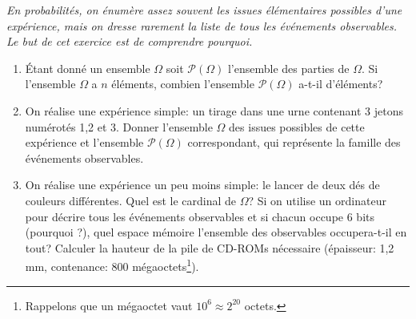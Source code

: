 \documentclass[a4paper,12pt,reqno]{amsart}
\begin{document}
\begin{exo} %

  \emph{En probabilités, on énumère assez souvent les issues élémentaires possibles d'une expérience, mais on dresse rarement la liste de tous les événements observables. Le but de cet exercice est de comprendre pourquoi.}

  \begin{enumerate}

    \item Étant donné un ensemble $\Omega$ soit $\mathcal{P}(\Omega)$ l'ensemble des parties de $\Omega$. Si l'ensemble $\Omega$ a $n$ éléments, combien l'ensemble $\mathcal{P}(\Omega)$ a-t-il d'éléments?

    \item On réalise une expérience simple: un tirage dans une urne contenant 3 jetons numérotés 1,2 et 3.  Donner l'ensemble $\Omega$ des issues possibles de cette expérience et l'ensemble $\mathcal{P}(\Omega)$ correspondant, qui représente la famille des événements observables.

    \item On réalise une expérience un peu moins simple: le lancer de deux dés de couleurs différentes.  Quel est le cardinal de $\Omega$?  Si on utilise un ordinateur pour décrire tous les événements observables et si chacun occupe 6 bits (pourquoi ?), quel espace mémoire l'ensemble des observables occupera-t-il en tout?  Calculer la hauteur de la pile de CD-ROMs nécessaire (épaisseur: 1,2\,mm, contenance: 800 mégaoctets\footnote{Rappelons que un mégaoctet vaut $10^{6} \approx 2^{20}$ octets.}).
  \end{enumerate}
\end{exo}
\end{document}
